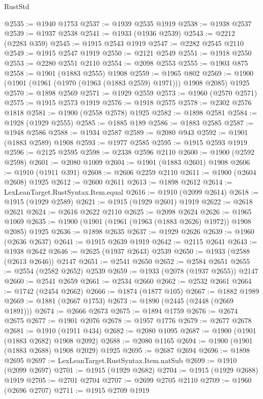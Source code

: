 \begin{lexlean}{RustStd}
\begin{coremodule}
@2535 := @1940 @1753
@2537 := @1939 @2535 @1919
@2538 := @1938 @2537
@2539 := @1937 @2538
@2541 := @1933 (@1936 @2539)
@2543 := @2212 (@2283 @359)
@2545 := @1915 @2543 @1919
@2547 := @2282 @2545 @2110
@2549 := @1915 @2547 @1919
@2550 := @2121 @2549
@2551 := @1918 @2550
@2553 := @2280 @2551 @2110
@2554 := @2098 @2553
@2555 := @1903 @875
@2558 := @1901 (@1883 @2555) @1908
@2559 := @1965 @802
@2569 := @1900 (@1901 (@1961 (@1970 (@1963 (@1883 @2559) @1971))) @1908 @2085) @1925
@2570 := @1898 @2569
@2571 := @1929 @2559
@2573 := @1960 (@2570 @2571)
@2575 := @1915 @2573 @1919
@2576 := @1918 @2575
@2578 := @2302 @2576 @1818
@2581 := @1900 (@2558 @2578) @1925
@2582 := @1898 @2581
@2584 := @1928 (@1929 @2555)
@2585 := @1885 @189
@2586 := @1883 @2585
@2587 := @1948 @2586
@2588 := @1934 @2587
@2589 := @2080 @943
@2592 := @1901 (@1883 @2589) @1908
@2593 := @1977 @2585
@2595 := @1915 @2593 @1919
@2596 := @2125 @2595
@2598 := @2338 @2596 @2110
@2600 := @1900 (@2592 @2598)
@2601 := @2080 @1009
@2604 := @1901 (@1883 @2601) @1908
@2606 := @1910 (@1911 @391)
@2608 := @2606 @2259 @2110
@2611 := @1900 (@2604 @2608) @1925
@2612 := @2600 @2611
@2613 := @1898 @2612
@2614 := LexLeanTarget.RustSyntax.Item.equal
@2616 := @1910 (@2099 @2614)
@2618 := @1915 (@1929 @2589)
@2621 := @1915 (@1929 @2601) @1919
@2622 := @2618 @2621
@2624 := @2616 @2622 @2110
@2625 := @2098 @2624
@2626 := @1965 @1069
@2635 := @1900 (@1901 (@1961 (@1963 (@1883 @2626) @1972)) @1908 @2085) @1925
@2636 := @1898 @2635
@2637 := @1929 @2626
@2639 := @1960 (@2636 @2637)
@2641 := @1915 @2639 @1919
@2642 := @2115 @2641
@2643 := @1938 @2642
@2646 := @2625 (@1937 @2643) @2539
@2650 := @1933 (@2588 (@2613 @2646)) @2147
@2651 := @2541 @2650
@2652 := @2584 @2651
@2655 := @2554 (@2582 @2652) @2539
@2659 := @1933 (@2078 (@1937 @2655)) @2147
@2660 := @2541 @2659
@2661 := @2534 @2660
@2662 := @2532 @2661
@2664 := @1742 (@2454 @2662)
@2666 := @1874 (@1877 @105)
@2667 := @1882 @1989
@2669 := @1881 (@2667 @1753)
@2673 := @1890 (@2445 (@2448 (@2669 @1891)))
@2674 := @2666 @2673
@2675 := @1894 @1759
@2676 := @2674 @2675
@2677 := @1901 @2076
@2678 := @1957 @1776
@2679 := @2677 @2678
@2681 := @1910 (@1911 @434)
@2682 := @2080 @1095
@2687 := @1900 (@1901 (@1883 @2682) @1908 @2092)
@2688 := @2080 @1165
@2694 := @1900 (@1901 (@1883 @2688) @1908 @2029) @1925
@2695 := @2687 @2694
@2696 := @1898 @2695
@2697 := LexLeanTarget.RustSyntax.Item.natSub
@2699 := @1910 (@2099 @2697)
@2701 := @1915 (@1929 @2682)
@2704 := @1915 (@1929 @2688) @1919
@2705 := @2701 @2704
@2707 := @2699 @2705 @2110
@2709 := @1960 (@2696 @2707)
@2711 := @1915 @2709 @1919

\end{coremodule}
\end{lexlean}
